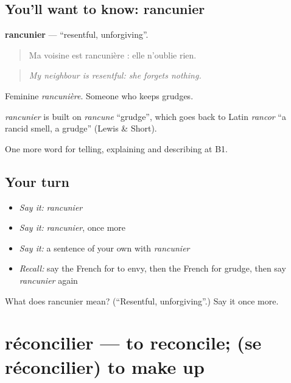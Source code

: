 \subsection*{You'll want to know: rancunier}
\textbf{rancunier} — \textquotedblleft{}resentful, unforgiving\textquotedblright{}.

\begin{quote}
Ma voisine est rancunière : elle n'oublie rien.
\end{quote}

\begin{quote}
\emph{My neighbour is resentful: she forgets nothing.}
\end{quote}

Feminine \emph{rancunière}. Someone who keeps grudges.

\begin{cousinweb}
\emph{rancunier} is built on \emph{rancune} \textquotedblleft{}grudge\textquotedblright{}, which goes back to Latin \emph{rancor} \textquotedblleft{}a rancid smell, a grudge\textquotedblright{} (Lewis \& Short).
\end{cousinweb}

\begin{grammarlens}[title={What you've built}]
One more word for telling, explaining and describing at B1.
\end{grammarlens}

\subsection*{Your turn}
\begin{itemize}
\raggedright
  \item \emph{Say it:} \emph{rancunier}
  \item \emph{Say it:} \emph{rancunier}, once more
  \item \emph{Say it:} a sentence of your own with \emph{rancunier}
  \item \emph{Recall:} say the French for to envy, then the French for grudge, then say \emph{rancunier} again
\end{itemize}

\begin{tcolorbox}[breakable,colback=teal!4,colframe=teal!35!black,title={Before you move on}]
What does rancunier mean? (\textquotedblleft{}Resentful, unforgiving\textquotedblright{}.) Say it once more.
\end{tcolorbox}
\section[réconcilier]{réconcilier — to reconcile; (se réconcilier) to make up}

